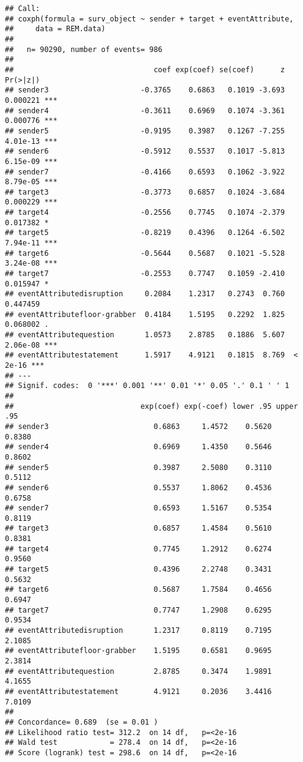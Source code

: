 \documentclass[
]{article}
\begin{document}
\begin{verbatim}
## Call:
## coxph(formula = surv_object ~ sender + target + eventAttribute, 
##     data = REM.data)
## 
##   n= 90290, number of events= 986 
## 
##                                coef exp(coef) se(coef)      z Pr(>|z|)    
## sender3                     -0.3765    0.6863   0.1019 -3.693 0.000221 ***
## sender4                     -0.3611    0.6969   0.1074 -3.361 0.000776 ***
## sender5                     -0.9195    0.3987   0.1267 -7.255 4.01e-13 ***
## sender6                     -0.5912    0.5537   0.1017 -5.813 6.15e-09 ***
## sender7                     -0.4166    0.6593   0.1062 -3.922 8.79e-05 ***
## target3                     -0.3773    0.6857   0.1024 -3.684 0.000229 ***
## target4                     -0.2556    0.7745   0.1074 -2.379 0.017382 *  
## target5                     -0.8219    0.4396   0.1264 -6.502 7.94e-11 ***
## target6                     -0.5644    0.5687   0.1021 -5.528 3.24e-08 ***
## target7                     -0.2553    0.7747   0.1059 -2.410 0.015947 *  
## eventAttributedisruption     0.2084    1.2317   0.2743  0.760 0.447459    
## eventAttributefloor-grabber  0.4184    1.5195   0.2292  1.825 0.068002 .  
## eventAttributequestion       1.0573    2.8785   0.1886  5.607 2.06e-08 ***
## eventAttributestatement      1.5917    4.9121   0.1815  8.769  < 2e-16 ***
## ---
## Signif. codes:  0 '***' 0.001 '**' 0.01 '*' 0.05 '.' 0.1 ' ' 1
## 
##                             exp(coef) exp(-coef) lower .95 upper .95
## sender3                        0.6863     1.4572    0.5620    0.8380
## sender4                        0.6969     1.4350    0.5646    0.8602
## sender5                        0.3987     2.5080    0.3110    0.5112
## sender6                        0.5537     1.8062    0.4536    0.6758
## sender7                        0.6593     1.5167    0.5354    0.8119
## target3                        0.6857     1.4584    0.5610    0.8381
## target4                        0.7745     1.2912    0.6274    0.9560
## target5                        0.4396     2.2748    0.3431    0.5632
## target6                        0.5687     1.7584    0.4656    0.6947
## target7                        0.7747     1.2908    0.6295    0.9534
## eventAttributedisruption       1.2317     0.8119    0.7195    2.1085
## eventAttributefloor-grabber    1.5195     0.6581    0.9695    2.3814
## eventAttributequestion         2.8785     0.3474    1.9891    4.1655
## eventAttributestatement        4.9121     0.2036    3.4416    7.0109
## 
## Concordance= 0.689  (se = 0.01 )
## Likelihood ratio test= 312.2  on 14 df,   p=<2e-16
## Wald test            = 278.4  on 14 df,   p=<2e-16
## Score (logrank) test = 298.6  on 14 df,   p=<2e-16
\end{verbatim}
\end{document}
